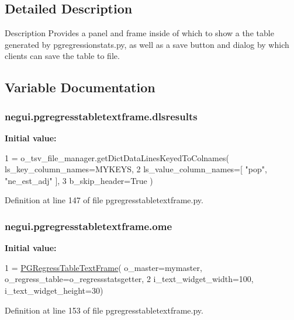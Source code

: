 \subsection{Detailed Description}
\begin{DoxyVerb}Description
Provides a panel and frame inside of which
to show a the table generated by pgregressionstats.py,
as well as a save button and dialog by which clients
can save the table to file.
\end{DoxyVerb}
 

\subsection{Variable Documentation}
\subsubsection[{\texorpdfstring{dlsresults}{dlsresults}}]{\setlength{\rightskip}{0pt plus 5cm}negui.\+pgregresstabletextframe.\+dlsresults}\hypertarget{namespacenegui_1_1pgregresstabletextframe_a7a1fc982c04e251fe1fafb607d787414}{}\label{namespacenegui_1_1pgregresstabletextframe_a7a1fc982c04e251fe1fafb607d787414}
{\bfseries Initial value\+:}
\begin{DoxyCode}
1 = o\_tsv\_file\_manager.getDictDataLinesKeyedToColnames( ls\_key\_column\_names=MYKEYS, 
2                                             ls\_value\_column\_names=[ \textcolor{stringliteral}{"pop"}, \textcolor{stringliteral}{"ne\_est\_adj"} ],
3                                             b\_skip\_header=\textcolor{keyword}{True} )
\end{DoxyCode}


Definition at line 147 of file pgregresstabletextframe.\+py.

\subsubsection[{\texorpdfstring{ome}{ome}}]{\setlength{\rightskip}{0pt plus 5cm}negui.\+pgregresstabletextframe.\+ome}\hypertarget{namespacenegui_1_1pgregresstabletextframe_a6c99b1e76eb6e084761f495f456d26fb}{}\label{namespacenegui_1_1pgregresstabletextframe_a6c99b1e76eb6e084761f495f456d26fb}
{\bfseries Initial value\+:}
\begin{DoxyCode}
1 = \hyperlink{classnegui_1_1pgregresstabletextframe_1_1PGRegressTableTextFrame}{PGRegressTableTextFrame}( o\_master=mymaster, o\_regress\_table=o\_regressstatsgetter,
2                     i\_text\_widget\_width=100, i\_text\_widget\_height=30)
\end{DoxyCode}


Definition at line 153 of file pgregresstabletextframe.\+py.

